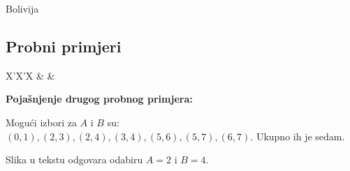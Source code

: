 \begin{statement}[
  problempoints=100,
  timelimit=1 sekunda,
  memorylimit=512 MiB,
]{Bolivija}
\subsection*{Probni primjeri}
\begin{tabularx}{\textwidth}{X'X'X}
 &
 &
\end{tabularx}

\textbf{Pojašnjenje drugog probnog primjera:}

Mogući izbori za $A$ i $B$ su: 
$(0, 1), (2, 3), (2, 4), (3, 4), (5, 6), (5, 7), (6, 7)$. 
Ukupno ih je sedam. 

Slika u tekstu odgovara odabiru $A = 2$ i $B = 4$.

\end{statement}

